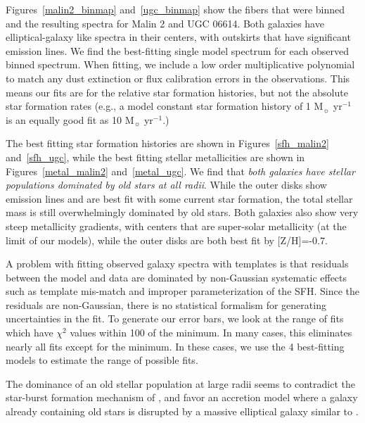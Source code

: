 \documentclass{emulateapj}
\begin{document}
Figures~\ref{malin2_binmap} and~\ref{ugc_binmap} show the fibers that were binned and the resulting spectra for Malin 2 and UGC 06614.  Both galaxies have elliptical-galaxy like spectra in their centers, with outskirts that have significant emission lines.  We find the best-fitting single model spectrum for each observed binned spectrum. When fitting, we include a low order multiplicative polynomial to match any dust extinction or flux calibration errors in the observations.  This means our fits are for the relative star formation histories, but not the absolute star formation rates (e.g., a model constant star formation history of 1 M$_\sun$ yr$^{-1}$ is an equally good fit as 10 M$_\sun$ yr$^{-1}$.)


The best fitting star formation histories are shown in Figures~\ref{sfh_malin2} and~\ref{sfh_ugc}, while the best fitting stellar metallicities are shown in Figures~\ref{metal_malin2} and~\ref{metal_ugc}.  We find that {\emph{both galaxies have stellar populations dominated by old stars at all radii}}.  While the outer disks show emission lines and are best fit with some current star formation, the total stellar mass is still overwhelmingly dominated by old stars.  Both galaxies also show very steep metallicity gradients, with centers that are super-solar metallicity (at the limit of our models), while the outer disks are both best fit by [Z/H]=-0.7.  

A problem with fitting observed galaxy spectra with templates is that residuals between the model and data are dominated by non-Gaussian systematic effects such as template mis-match and improper parameterization of the SFH.  Since the residuals are non-Gaussian, there is no statistical formalism for generating uncertainties in the fit.  To generate our error bars, we look at the range of fits which have $\chi^2$ values within 100 of the minimum.  In many cases, this eliminates nearly all fits except for the minimum.  In these cases, we use the 4 best-fitting models to estimate the range of possible fits.  

The dominance of an old stellar population at large radii seems to contradict the star-burst formation mechanism of \citet{Mapelli08}, and favor an accretion model where a galaxy already containing old stars is disrupted by a massive elliptical galaxy similar to \citet{Pen06}.  


\end{document}
